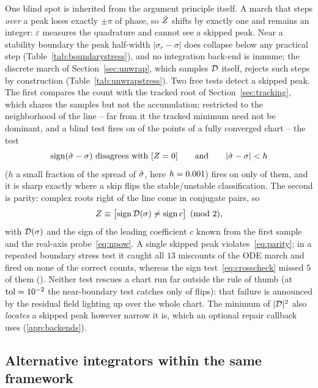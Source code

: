 One blind spot is inherited from the argument principle itself. A march that
steps \emph{over} a peak loses exactly $\pm\pi$ of phase, so $\tilde{Z}$ shifts by
exactly one and remains an integer: $\varepsilon$ measures the quadrature and
cannot see a skipped peak. Near a stability boundary the peak half-width
$|\sigma_r-\sigma|$ does collapse below any practical step
(Table~\ref{tab:boundarystress}), and no integration back-end is immune; the
discrete march of Section~\ref{sec:unwrap}, which samples $\mathcal{D}$ itself,
rejects such steps by construction (Table~\ref{tab:unwrapstress}). Two free
tests detect a skipped peak. The first compares the count with the tracked
root of Section~\ref{sec:tracking}, which shares the samples but not the
accumulation; restricted to the neighborhood of the line -- far from it the
tracked minimum need not be dominant, and a blind test fires on
\CheckNaiveRef{} of the \CheckNpoints{} points of a fully converged chart --
the test
\begin{equation}\label{eq:crosscheck}
  \operatorname{sign}(\hat{\sigma}-\sigma)\ \text{disagrees with}\ [Z=0]
  \qquad\text{and}\qquad |\hat{\sigma}-\sigma| < h
\end{equation}
($h$ a small fraction of the spread of $\hat{\sigma}$, here $h=0.001$) fires on
only \CheckNearRef{} of them, and it is sharp exactly where a skip flips the
stable/unstable classification. The second is parity: complex roots right of
the line come in conjugate pairs, so
\begin{equation}\label{eq:parity}
  Z \equiv \bigl[\operatorname{sign}\mathcal{D}(\sigma)\neq\operatorname{sign}c\bigr]
  \pmod 2 ,
\end{equation}
with $\mathcal{D}(\sigma)$ and the sign of the leading coefficient $c$ known from
the first sample and the real-axis probe~\eqref{eq:npow}. A single skipped
peak violates~\eqref{eq:parity}; in a repeated boundary stress test it caught
all $13$ miscounts of the ODE march and fired on none of the correct counts,
whereas the sign test~\eqref{eq:crosscheck} missed $5$ of them
(). Neither test rescues a chart run far outside the
rule of thumb (at $\mathrm{tol}=10^{-2}$ the near-boundary test catches
only \CheckLooseCaught{} of \CheckLooseFlips{} flips): that failure is
announced by the residual field lighting up over the whole chart. The
minimum of $|\mathcal{D}|^{2}$ also \emph{locates} a skipped peak however narrow it
is, which an optional repair callback uses (\ref{app:backends}).

\subsection{Alternative integrators within the same framework}\label{sec:alternatives}

